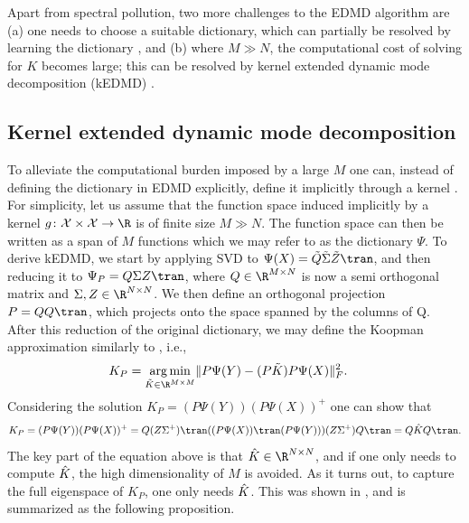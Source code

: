 \documentclass{article}
\begin{document}
Apart from spectral pollution, two more challenges to the EDMD algorithm are (a) one needs to choose a suitable dictionary, which can partially be resolved by learning the dictionary \citep{li-2017}, and (b) where \(M \gg N\), the computational cost of solving for \(K\) becomes large; this can be resolved by kernel extended dynamic mode decomposition (kEDMD) \citep{williams-2015b}.

\subsection{Kernel extended dynamic mode decomposition}
To alleviate the computational burden imposed by a large \(M\) one can, instead of defining the dictionary in EDMD explicitly, define it implicitly through a kernel \citep{williams-2015b}. For simplicity, let us assume that the function space induced implicitly by a kernel \(g\colon \mathcal{X} \times \mathcal{X} \rightarrow \R\) is of finite size \(M \gg N\). The function space can then be written as a span of \(M\) functions which we may refer to as the dictionary \(\Psi\). To derive kEDMD, we start by  applying SVD to \(\Psi(X) = \Tilde Q \Tilde \Sigma \Tilde Z\tran\), and then reducing it to \( \Psi_P = Q\Sigma Z\tran\), where \(Q\in \R^{M\times N}\) is now a semi orthogonal matrix and \(\Sigma, Z \in \R^{N\times N}\). We then define an orthogonal projection \(P = QQ\tran\), which projects onto the space spanned by the columns of Q. After this reduction of the original dictionary, we may define the Koopman approximation similarly to , i.e.,
\begin{align*}
   K_P&= \underset{\tilde{K} \in \R^{M\times M}}{\arg\min} \lVert P\Psi(Y) - (P\tilde K)P\Psi(X)\rVert^2_F.
\end{align*}
Considering the solution \(K_P = (P\Psi(Y))(P\Psi(X))^+\) one can show that
\begin{align}\label{eq:def_khat}
    K_P = (P\Psi(Y))(P\Psi(X))^+ = Q(Z\Sigma^+)\tran ((P\Psi(X))\tran (P\Psi(Y))) (Z\Sigma^+) Q\tran = Q \Hat K Q\tran.
\end{align}
The key part of the equation above is that \(\Hat K \in \R^{N\times N}\), and if one only needs to compute \(\Hat K\), the high dimensionality of \(M\) is avoided. As it turns out, to capture the full eigenspace of \(K_P\), one only needs \(\Hat K\). This was shown in \citet{williams-2015b}, and is summarized as the following proposition.
\end{document}
